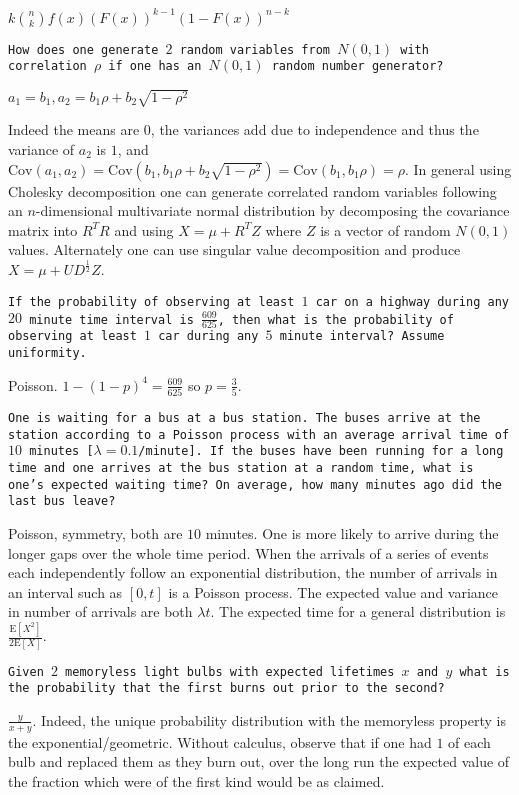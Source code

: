 $\boxed{k \binom{n}{k} f(x)(F(x))^{k-1}(1-F(x))^{n-k}}$

\texttt{How does one generate $2$ random variables from $N(0,1)$ with correlation $\rho$ if one has an $N(0,1)$ random number generator?}

$\boxed{a_1 = b_1, a_2 = b_1 \rho + b_2 \sqrt{1-\rho^2}}$

Indeed the means are $0$, the variances add due to independence and thus the variance of $a_2$ is $1$, and $\text{Cov}(a_1,a_2) = \text{Cov}(b_1,b_1 \rho + b_2 \sqrt{1-\rho^2}) = \text{Cov}(b_1,b_1 \rho) = \rho$. In general using Cholesky decomposition one can generate correlated random variables following an $n$-dimensional multivariate normal distribution by decomposing the covariance matrix into $R^T R$ and using $X=\mu+R^T Z$ where $Z$ is a vector of random $N(0,1)$ values. Alternately one can use singular value decomposition and produce $X=\mu+UD^{\frac{1}{2}}Z$.

\texttt{If the probability of observing at least $1$ car on a highway during any $20$ minute time interval is $\frac{609}{625}$, then what is the probability of observing at least $1$ car during any $5$ minute interval? Assume uniformity.}

Poisson. $1-(1-p)^4 = \frac{609}{625}$ so $p = \boxed{\frac{3}{5}}$.

\texttt{One is waiting for a bus at a bus station. The buses arrive at the station according to a Poisson process with an average arrival time of $10$ minutes [$\lambda = 0.1$/minute]. If the buses have been running for a long time and one arrives at the bus station at a random time, what is one's expected waiting time? On average, how many minutes ago did the last bus leave?}

Poisson, symmetry, both are $\boxed{10}$ minutes. One is more likely to arrive during the longer gaps over the whole time period. When the arrivals of a series of events each independently follow an exponential distribution, the number of arrivals in an interval such as $[0,t]$ is a Poisson process. The expected value and variance in number of arrivals are both $\lambda t$. The expected time for a general distribution is $\boxed{\frac{\text{E}[X^2]}{2\text{E}[X]}}$.

\texttt{Given $2$ memoryless light bulbs with expected lifetimes $x$ and $y$ what is the probability that the first burns out prior to the second?}

$\boxed{\frac{y}{x+y}}$. Indeed, the unique probability distribution with the memoryless property is the exponential/geometric. Without calculus, observe that if one had $1$ of each bulb and replaced them as they burn out, over the long run the expected value of the fraction which were of the first kind would be as claimed.

